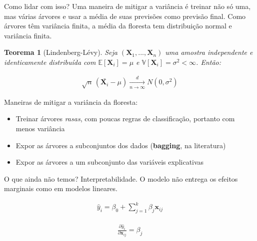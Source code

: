 \documentclass{beamer} %
\newtheorem{teo}{Teorema}
\newcommand{\E}{\mathbb{E}}
\newcommand{\V}{\mathbb{V}}
\newcommand{\1}{\mathbb{I}}
\begin{document}
\begin{frame}
Como lidar com isso? Uma maneira de mitigar a variância é treinar não só uma, mas várias árvores e usar a média de suas previsões como previsão final. Como árvores têm variância finita, a média da floresta tem distribuição normal e variância finita.

\begin{teo}[Lindenberg-Lévy]
Seja $(\textbf{X}_1, ..., \textbf{X}_n)$ uma amostra independente e identicamente distribuída com $\E[\textbf{X}_i] = \mu$ e $\V[\textbf{X}_i] = \sigma^2 < \infty$. Então:

\begin{align}
    \sqrt{n}\,(\bar{\textbf{X}_i }- \mu) \xrightarrow[n \to \infty]{d} N(0, \sigma^2)
\end{align}

\end{teo}
\end{frame}


\begin{frame}
Maneiras de mitigar a variância da floresta:

\begin{itemize}
    \item Treinar árvores \textit{rasas}, com poucas regras de classificação, portanto com menos variância
    \item Expor as árvores a subconjuntos dos dados (\textbf{bagging}, na literatura)
    \item Expor as árvores a um subconjunto das variáveis explicativas
\end{itemize}
\end{frame}



\begin{frame}
O que ainda não temos? Interpretabilidade. O modelo não entrega os efeitos marginais como em modelos lineares.

\begin{align}
    \hat{y}_i = \beta_0 + \sum_{j=1}^{k} \beta_j \mathbf{x}_{ij} 
\end{align}


\begin{align}
    \frac{\partial \hat{y}_i}{\partial \mathbf{x}_{ij} } = \beta_j
\end{align}
\end{frame}
\end{document}
